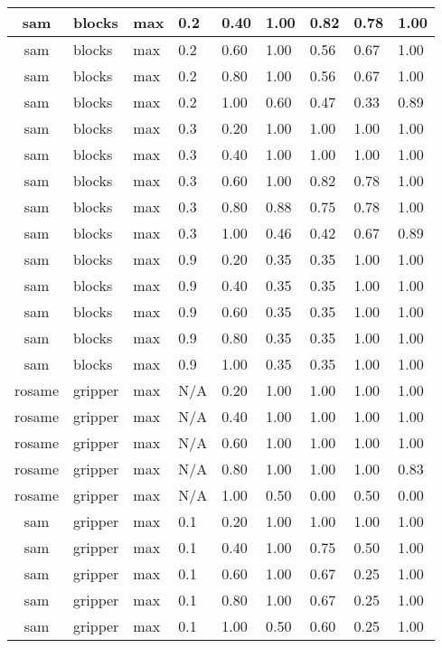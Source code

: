 \begin{table}[ht]
\begin{tabular}{c}
sam & blocks & max & 0.2 & 0.40 & 1.00 & 0.82 & 0.78 & 1.00 \\ \hline
sam & blocks & max & 0.2 & 0.60 & 1.00 & 0.56 & 0.67 & 1.00 \\ \hline
sam & blocks & max & 0.2 & 0.80 & 1.00 & 0.56 & 0.67 & 1.00 \\ \hline
sam & blocks & max & 0.2 & 1.00 & 0.60 & 0.47 & 0.33 & 0.89 \\ \hline
sam & blocks & max & 0.3 & 0.20 & 1.00 & 1.00 & 1.00 & 1.00 \\ \hline
sam & blocks & max & 0.3 & 0.40 & 1.00 & 1.00 & 1.00 & 1.00 \\ \hline
sam & blocks & max & 0.3 & 0.60 & 1.00 & 0.82 & 0.78 & 1.00 \\ \hline
sam & blocks & max & 0.3 & 0.80 & 0.88 & 0.75 & 0.78 & 1.00 \\ \hline
sam & blocks & max & 0.3 & 1.00 & 0.46 & 0.42 & 0.67 & 0.89 \\ \hline
sam & blocks & max & 0.9 & 0.20 & 0.35 & 0.35 & 1.00 & 1.00 \\ \hline
sam & blocks & max & 0.9 & 0.40 & 0.35 & 0.35 & 1.00 & 1.00 \\ \hline
sam & blocks & max & 0.9 & 0.60 & 0.35 & 0.35 & 1.00 & 1.00 \\ \hline
sam & blocks & max & 0.9 & 0.80 & 0.35 & 0.35 & 1.00 & 1.00 \\ \hline
sam & blocks & max & 0.9 & 1.00 & 0.35 & 0.35 & 1.00 & 1.00 \\ \hline
rosame & gripper & max & N/A & 0.20 & 1.00 & 1.00 & 1.00 & 1.00 \\ \hline
rosame & gripper & max & N/A & 0.40 & 1.00 & 1.00 & 1.00 & 1.00 \\ \hline
rosame & gripper & max & N/A & 0.60 & 1.00 & 1.00 & 1.00 & 1.00 \\ \hline
rosame & gripper & max & N/A & 0.80 & 1.00 & 1.00 & 1.00 & 0.83 \\ \hline
rosame & gripper & max & N/A & 1.00 & 0.50 & 0.00 & 0.50 & 0.00 \\ \hline
sam & gripper & max & 0.1 & 0.20 & 1.00 & 1.00 & 1.00 & 1.00 \\ \hline
sam & gripper & max & 0.1 & 0.40 & 1.00 & 0.75 & 0.50 & 1.00 \\ \hline
sam & gripper & max & 0.1 & 0.60 & 1.00 & 0.67 & 0.25 & 1.00 \\ \hline
sam & gripper & max & 0.1 & 0.80 & 1.00 & 0.67 & 0.25 & 1.00 \\ \hline
sam & gripper & max & 0.1 & 1.00 & 0.50 & 0.60 & 0.25 & 1.00 \\ \hline

\end{tabular}
\end{table}
